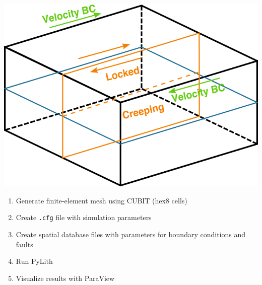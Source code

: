 \documentclass[pdftex,cig,slideColor]{pp4slides}
\begin{document}

  \vfill
  \begin{center}
    \includegraphics[scale=0.7]{figs/examplehex8}
  \end{center}

  \summary{}

  \begin{enumerate}
  \item Generate finite-element mesh using CUBIT (hex8 cells)
  \item Create {\tt .cfg} file with simulation parameters
  \item Create spatial database files with parameters for boundary
    conditions and faults
  \item Run PyLith
  \item Visualize results with ParaView
  \end{enumerate}


\end{document}
